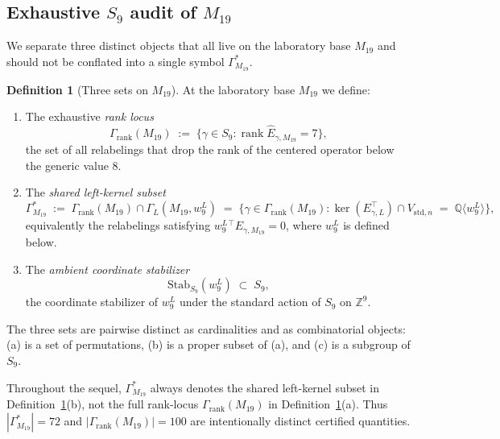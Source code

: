 \documentclass[11pt,a4paper]{article}
\theoremstyle{definition}
\newtheorem{definition}[theorem]{Definition}
\theoremstyle{remark}
\providecommand{\rank}{\operatorname{rank}}
\newcommand{\Vstdn}{V_{\mathrm{std},n}}
\newcommand{\Egamma}{E_{\gamma,L}}
\newcommand{\GrankM}{\Gamma_{\mathrm{rank}}(M_{19})}
\newcommand{\GMninetn}{\Gamma^{*}_{M_{19}}}     %
\newcommand{\wleftnine}{w^{L}_{9}}
\newcommand{\StabWnine}{\mathrm{Stab}_{S_9}(\wleftnine)}
\begin{document}
\subsection{\texorpdfstring{Exhaustive $S_9$ audit of $M_{19}$}{Exhaustive S9 audit of M19}}\label{sec:M19-audit}

We separate three distinct objects that all live on the laboratory base
$M_{19}$ and should not be conflated into a single symbol
$\Gamma^*_{M_{19}}$.

\begin{definition}[Three sets on $M_{19}$]\label{def:M19-three-sets}
At the laboratory base $M_{19}$ we define:
\begin{enumerate}
   \item[\rm (a)] The exhaustive \emph{rank locus}
   \begin{equation*}
      \GrankM \;:=\; \bigl\{\gamma \in S_9 : \rank \widehat{E}_{\gamma, M_{19}} = 7\bigr\},
   \end{equation*}
   the set of all relabelings that drop the rank of the centered operator
   below the generic value $8$.
   \item[\rm (b)] The \emph{shared left-kernel subset}
   \begin{equation*}
      \GMninetn \;:=\; \GrankM \cap \Gamma_L(M_{19},\wleftnine)
      \;=\; \bigl\{\gamma \in \GrankM :
         \ker(\Egamma^{\!\top}) \cap \Vstdn
         \;=\; \mathbb{Q}\langle \wleftnine \rangle \bigr\},
   \end{equation*}
   equivalently the relabelings satisfying
   $\wleftnine{}^{\!\top}E_{\gamma,M_{19}}=0$, where $\wleftnine$ is
   defined below.
   \item[\rm (c)] The \emph{ambient coordinate stabilizer}
   \begin{equation*}
      \StabWnine \;\subset\; S_9,
   \end{equation*}
   the coordinate stabilizer of $\wleftnine$ under the standard action of
   $S_9$ on $\mathbb{Z}^9$.
\end{enumerate}
The three sets are pairwise distinct as cardinalities and as combinatorial
objects: (a) is a set of permutations, (b) is a proper subset of (a), and
(c) is a subgroup of $S_9$.
\end{definition}

Throughout the sequel, $\GMninetn$ always denotes the shared left-kernel
subset in Definition~\ref{def:M19-three-sets}(b), not the full
rank-locus $\GrankM$ in Definition~\ref{def:M19-three-sets}(a). Thus
$|\GMninetn| = 72$ and $|\GrankM| = 100$ are intentionally distinct
certified quantities.
\end{document}

